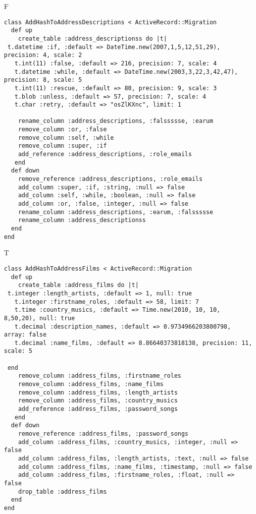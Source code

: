 F
\begin{verbatim}
class AddHashToAddressDescriptions < ActiveRecord::Migration
  def up
    create_table :address_descriptionss do |t| 
 t.datetime :if, :default => DateTime.new(2007,1,5,12,51,29), precision: 4, scale: 2
   t.int(11) :false, :default => 216, precision: 7, scale: 4
   t.datetime :while, :default => DateTime.new(2003,3,22,3,42,47), precision: 8, scale: 5
   t.int(11) :rescue, :default => 80, precision: 9, scale: 3
   t.blob :unless, :default => 57, precision: 7, scale: 4
   t.char :retry, :default => "osZlKXnc", limit: 1

    rename_column :address_descriptions, :falssssse, :earum
    remove_column :or, :false
    remove_column :self, :while
    remove_column :super, :if
    add_reference :address_descriptions, :role_emails
   end
  def down
    remove_reference :address_descriptions, :role_emails
    add_column :super, :if, :string, :null => false
    add_column :self, :while, :boolean, :null => false
    add_column :or, :false, :integer, :null => false
    rename_column :address_descriptions, :earum, :falssssse
    rename_column :address_descriptionss
  end
end
\end{verbatim}

T
\begin{verbatim}
class AddHashToAddressFilms < ActiveRecord::Migration
  def up
    create_table :address_films do |t|
 t.integer :length_artists, :default => 1, null: true
   t.integer :firstname_roles, :default => 58, limit: 7
   t.time :country_musics, :default => Time.new(2010, 10, 10, 8,50,20), null: true
   t.decimal :description_names, :default => 0.9734966203800798, array: false
   t.decimal :name_films, :default => 8.86640373818138, precision: 11, scale: 5

 end
    remove_column :address_films, :firstname_roles
    remove_column :address_films, :name_films
    remove_column :address_films, :length_artists
    remove_column :address_films, :country_musics
    add_reference :address_films, :password_songs
   end
  def down
    remove_reference :address_films, :password_songs
    add_column :address_films, :country_musics, :integer, :null => false
    add_column :address_films, :length_artists, :text, :null => false
    add_column :address_films, :name_films, :timestamp, :null => false
    add_column :address_films, :firstname_roles, :float, :null => false
    drop_table :address_films
  end
end
\end{verbatim}

